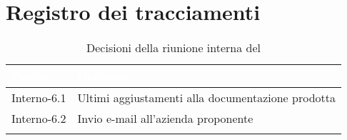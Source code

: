 \section{Registro dei tracciamenti}
{
\renewcommand{\arraystretch}{1.5}
\centering
\begin{longtable}{C{3cm} C{9cm}}
\textcolor{white}{\textbf{Codice}}&
\textcolor{white}{\textbf{Decisione}}\\	

\endhead
		
Interno-6.1 & Ultimi aggiustamenti alla documentazione prodotta\\
Interno-6.2 & Invio e-mail all'azienda proponente\\
\caption{Decisioni della riunione interna del \Data{}}
\end{longtable}
}
